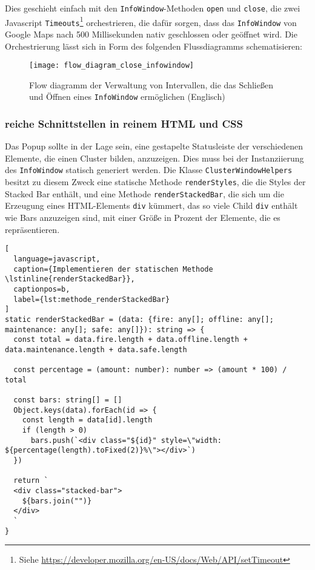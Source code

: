 Dies geschieht einfach mit den \lstinline{InfoWindow}-Methoden \lstinline{open} und \lstinline{close}, die zwei Javascript \lstinline{Timeouts}\footnote{Siehe \href{https://developer.mozilla.org/en-US/docs/Web/API/setTimeout}{https://developer.mozilla.org/en-US/docs/Web/API/setTimeout}} orchestrieren, die dafür sorgen, dass das \lstinline{InfoWindow} von Google Maps nach 500 Millisekunden nativ geschlossen oder geöffnet wird.
Die Orchestrierung lässt sich in Form des folgenden Flussdiagramms schematisieren:

\begin{figure}[H]
  \centering
  \texttt{[image: flow\_diagram\_close\_infowindow]}
  \caption{Flow diagramm der Verwaltung von Intervallen, die das Schließen und Öffnen eines \lstinline{InfoWindow} ermöglichen (Englisch)}
  \label{fig:flow_diagram_close_infowindow}
\end{figure}

\subsubsection{reiche Schnittstellen in reinem \ac{HTML} und \ac{CSS}}

Das Popup sollte in der Lage sein, eine gestapelte Statusleiste der verschiedenen Elemente, die einen Cluster bilden, anzuzeigen.
Dies muss bei der Instanziierung des \lstinline{InfoWindow} statisch generiert werden.
Die Klasse \lstinline{ClusterWindowHelpers} besitzt zu diesem Zweck eine statische Methode \lstinline{renderStyles}, die die Styles der Stacked Bar enthält, und eine Methode \lstinline{renderStackedBar}, die sich um die Erzeugung eines HTML-Elements \lstinline{div} kümmert, das so viele Child \lstinline{div} enthält wie Bars anzuzeigen sind, mit einer Größe in Prozent der Elemente, die es repräsentieren.

\begin{lstlisting}[
  language=javascript,
  caption={Implementieren der statischen Methode \lstinline{renderStackedBar}},
  captionpos=b,
  label={lst:methode_renderStackedBar}
]
static renderStackedBar = (data: {fire: any[]; offline: any[]; maintenance: any[]; safe: any[]}): string => {
  const total = data.fire.length + data.offline.length + data.maintenance.length + data.safe.length

  const percentage = (amount: number): number => (amount * 100) / total

  const bars: string[] = []
  Object.keys(data).forEach(id => {
    const length = data[id].length
    if (length > 0)
      bars.push(`<div class="${id}" style=\"width: ${percentage(length).toFixed(2)}%\"></div>`)
  })

  return `
  <div class="stacked-bar">
    ${bars.join("")}
  </div>
  `
}
\end{lstlisting}

